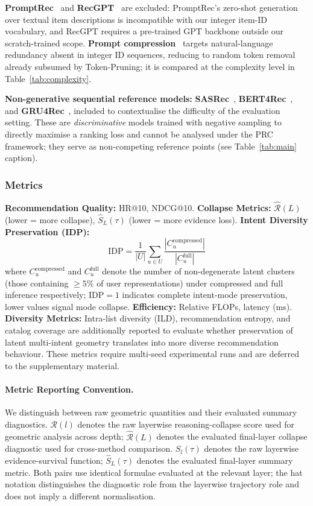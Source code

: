 \documentclass[lettersize,journal]{IEEEtran}
\begin{document}
\textbf{PromptRec}~\cite{liu2023pre} and \textbf{RecGPT}~\cite{liao2024recgpt} are excluded: PromptRec's zero-shot generation over textual item descriptions is incompatible with our integer item-ID vocabulary, and RecGPT requires a pre-trained GPT backbone outside our scratch-trained scope. \textbf{Prompt compression}~\cite{jiang2023longllmlingua} targets natural-language redundancy absent in integer ID sequences, reducing to random token removal already subsumed by Token-Pruning; it is compared at the complexity level in Table~\ref{tab:complexity}.

\textbf{Non-generative sequential reference models:} \textbf{SASRec}~\cite{kang2018sasrec}, \textbf{BERT4Rec}~\cite{sun2019bert4rec}, and \textbf{GRU4Rec}~\cite{hidasi2016gru4rec}, included to contextualise the difficulty of the evaluation setting.  These are \emph{discriminative} models trained with negative sampling to directly maximise a ranking loss and cannot be analysed under the PRC framework; they serve as non-competing reference points (see Table~\ref{tab:main} caption).

\subsubsection{Metrics}
\textbf{Recommendation Quality:} HR@10, NDCG@10.
\textbf{Collapse Metrics:} $\widehat{\mathcal{R}}(L)$ (lower = more collapse), $\widehat{S}_L(\tau)$ (lower = more evidence loss).
\textbf{Intent Diversity Preservation (IDP):}
\[
\mathrm{IDP} = \frac{1}{|U|}\sum_{u \in U} \frac{|C_u^{\mathrm{compressed}}|}{|C_u^{\mathrm{full}}|}
\]
where $C_u^{\mathrm{compressed}}$ and $C_u^{\mathrm{full}}$ denote the number of non-degenerate latent clusters (those containing $\geq 5\%$ of user representations) under compressed and full inference respectively; $\mathrm{IDP}=1$ indicates complete intent-mode preservation, lower values signal mode collapse.
\textbf{Efficiency:} Relative FLOPs, latency (ms).
\textbf{Diversity Metrics:} Intra-list diversity (ILD), recommendation entropy, and catalog coverage are additionally reported to evaluate whether preservation of latent multi-intent geometry translates into more diverse recommendation behaviour. These metrics require multi-seed experimental runs and are deferred to the supplementary material.

\paragraph{Metric Reporting Convention.}
We distinguish between raw geometric quantities and their evaluated summary diagnostics. $\mathcal{R}(l)$ denotes the raw layerwise reasoning-collapse score used for geometric analysis across depth; $\widehat{\mathcal{R}}(L)$ denotes the evaluated final-layer collapse diagnostic used for cross-method comparison. $S_l(\tau)$ denotes the raw layerwise evidence-survival function; $\widehat{S}_L(\tau)$ denotes the evaluated final-layer summary metric. Both pairs use identical formulae evaluated at the relevant layer; the hat notation distinguishes the diagnostic role from the layerwise trajectory role and does not imply a different normalisation.
\end{document}
